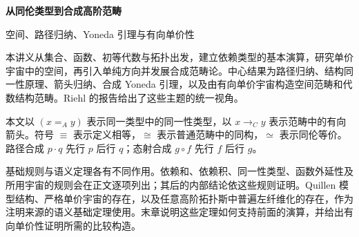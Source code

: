 \documentclass[12pt,oneside,openany,fontset=none]{ctexbook}
\theoremstyle{cn}
\numberwithin{equation}{chapter}
\begin{document}
\begin{center}
{\LARGE\bfseries 从同伦类型到合成高阶范畴\par}
\vspace{6pt}
{\large 空间、路径归纳、Yoneda 引理与有向单价性\par}
\end{center}
\vspace{8pt}
\noindent 本讲义从集合、函数、初等代数与拓扑出发，建立依赖类型的基本演算，研究单价宇宙中的空间，再引入单纯方向并发展合成范畴论。中心结果为路径归纳、结构同一性原理、箭头归纳、合成 Yoneda 引理，以及由有向单价宇宙构造空间范畴和代数结构范畴。Riehl 的报告\cite{RiehlICM}给出了这些主题的统一视角。

\noindent 本文以 $(x=_A y)$ 表示同一类型中的同一性类型，以 $x\to_C y$ 表示范畴中的有向箭头。符号 $\equiv$ 表示定义相等，$\cong$ 表示普通范畴中的同构，$\simeq$ 表示同伦等价。路径合成 $p\cdot q$ 先行 $p$ 后行 $q$；态射合成 $g\circ f$ 先行 $f$ 后行 $g$。

\noindent 基础规则与语义定理各有不同作用。依赖和、依赖积、同一性类型、函数外延性及所用宇宙的规则会在正文逐项列出；其后的内部结论依这些规则证明。Quillen 模型结构、严格单价宇宙的存在，以及任意高阶拓扑斯中普遍左纤维化的存在，作为注明来源的语义基础定理使用。末章说明这些定理如何支持前面的演算，并给出有向单价性证明所需的比较构造。

\setcounter{tocdepth}{1}
\tableofcontents






















\appendix



\end{document}
